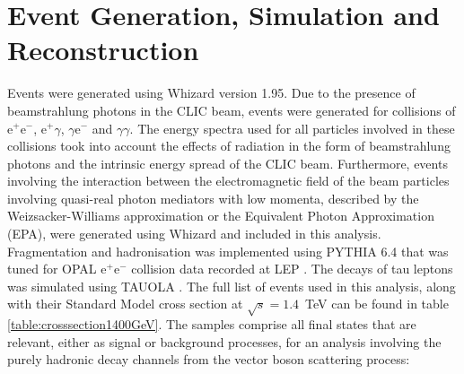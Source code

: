 \section{Event Generation, Simulation and Reconstruction}
\label{sec:eventgenerationandbackgrounds}
Events were generated using Whizard \cite{0708.4233, hep-ph/0102195} version 1.95.  Due to the presence of beamstrahlung photons in the CLIC beam, events were generated for collisions of $\text{e}^{+}\text{e}^{-}$, $\text{e}^{+}\gamma$, $\gamma\text{e}^{-}$ and $\gamma\gamma$.  The energy spectra used for all particles involved in these collisions took into account the effects of radiation in the form of beamstrahlung photons and the intrinsic energy spread of the CLIC beam.  Furthermore, events involving the interaction between the electromagnetic field of the beam particles involving quasi-real photon mediators with low momenta, described by the Weizsacker-Williams approximation or the Equivalent Photon Approximation (EPA), were generated using Whizard and included in this analysis.  Fragmentation and hadronisation was implemented using PYTHIA 6.4 \cite{Sjostrand:2006za} that was tuned for OPAL $\text{e}^{+}\text{e}^{-}$ collision data recorded at LEP \cite{Alexander:1995bk}.  The decays of tau leptons was simulated using TAUOLA \cite{Was:2000st}.  The full list of events used in this analysis, along with their Standard Model cross section at $\sqrt{s}=1.4$~TeV can be found in table \ref{table:crosssection1400GeV}.  The samples comprise all final states that are relevant, either as signal or background processes, for an analysis involving the purely hadronic decay channels from the vector boson scattering process:
